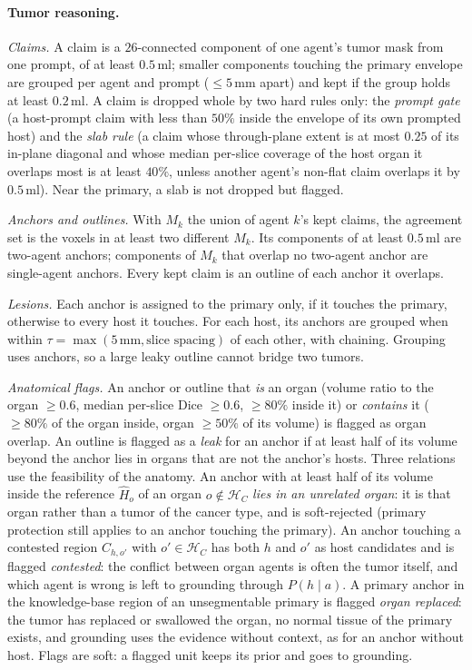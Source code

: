 \documentclass[fleqn,10pt]{olplainarticle}
\begin{document}
\paragraph{Tumor reasoning.}
\label{sec:tumor_details}
\emph{Claims.} A claim is a $26$-connected component of one agent's tumor mask from one prompt, of at least $0.5$\,ml; smaller
components touching the primary envelope are grouped per agent and prompt ($\le5$\,mm apart) and kept if the group holds at
least $0.2$\,ml. A claim is dropped whole by two hard rules only: the \emph{prompt gate} (a host-prompt claim with less than
$50\%$ inside the envelope of its own prompted host) and the \emph{slab rule} (a claim whose through-plane extent is at most
$0.25$ of its in-plane diagonal and whose median per-slice coverage of the host organ it overlaps most is at least $40\%$,
unless another agent's non-flat claim overlaps it by $0.5$\,ml). Near the primary, a slab is not dropped but flagged.

\emph{Anchors and outlines.} With $M_k$ the union of agent $k$'s kept claims, the agreement set is the voxels in at least two
different $M_k$. Its components of at least $0.5$\,ml are two-agent anchors; components of $M_k$ that overlap no two-agent
anchor are single-agent anchors. Every kept claim is an outline of each anchor it overlaps.

\emph{Lesions.} Each anchor is assigned to the primary only, if it touches the primary, otherwise to every host it touches.
For each host, its anchors are grouped when within $\tau=\max(5\,\mathrm{mm},\text{slice spacing})$ of each other, with
chaining. Grouping uses anchors, so a large leaky outline cannot bridge two tumors.

\emph{Anatomical flags.} An anchor or outline that \emph{is} an organ (volume ratio to the organ $\ge0.6$, median per-slice
Dice $\ge0.6$, $\ge80\%$ inside it) or \emph{contains} it ($\ge80\%$ of the organ inside, organ $\ge50\%$ of its volume) is
flagged as organ overlap. An outline is flagged as a \emph{leak} for an anchor if at least half of its volume beyond the
anchor lies in organs that are not the anchor's hosts. Three relations use the feasibility of the anatomy. An anchor with at
least half of its volume inside the reference $\hat H_o$ of an organ $o\notin\mathcal{H}_C$ \emph{lies in an unrelated
organ}: it is that organ rather than a tumor of the cancer type, and is soft-rejected (primary protection still applies to an
anchor touching the primary). An anchor touching a contested region $C_{h,o'}$ with $o'\in\mathcal{H}_C$ has both $h$ and $o'$
as host candidates and is flagged \emph{contested}: the conflict between organ agents is often the tumor itself, and which
agent is wrong is left to grounding through $P(h\mid a)$. A primary anchor in the knowledge-base region of an unsegmentable
primary is flagged \emph{organ replaced}: the tumor has replaced or swallowed the organ, no normal tissue of the primary
exists, and grounding uses the evidence without context, as for an anchor without host. Flags are soft: a flagged unit
keeps its prior and goes to grounding.
\end{document}
